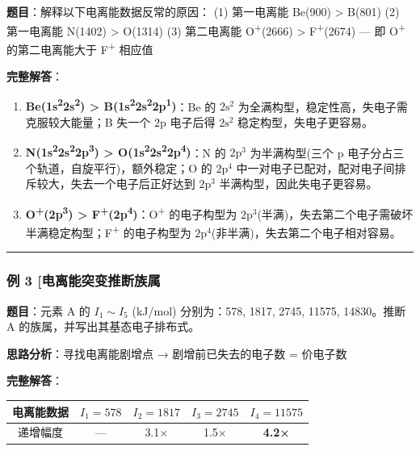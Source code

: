 \textbf{题目}：解释以下电离能数据反常的原因：
(1) 第一电离能 Be(900) \textgreater{} B(801)
(2) 第一电离能 N(1402) \textgreater{} O(1314)
(3) 第二电离能 O\textsuperscript{+}(2666) \textgreater{} F\textsuperscript{+}(2674) --- 即 O\textsuperscript{+} 的第二电离能大于 F\textsuperscript{+} 相应值

\textbf{完整解答}：

\begin{enumerate}
\def\labelenumi{(\arabic{enumi})}
\item
  \textbf{Be(1s\textsuperscript{2}2s\textsuperscript{2}) \textgreater{} B(1s\textsuperscript{2}2s\textsuperscript{2}2p\textsuperscript{1})}：Be 的 \(2\mathrm{s}^2\) 为全满构型，稳定性高，失电子需克服较大能量；B 失一个 \(2\mathrm{p}\) 电子后得 \(2\mathrm{s}^2\) 稳定构型，失电子更容易。
\item
  \textbf{N(1s\textsuperscript{2}2s\textsuperscript{2}2p\textsuperscript{3}) \textgreater{} O(1s\textsuperscript{2}2s\textsuperscript{2}2p\textsuperscript{4})}：N 的 \(2\mathrm{p}^3\) 为半满构型(三个 p 电子分占三个轨道，自旋平行)，额外稳定；O 的 \(2\mathrm{p}^4\) 中一对电子已配对，配对电子间排斥较大，失去一个电子后正好达到 \(2\mathrm{p}^3\) 半满构型，因此失电子更容易。
\item
  \textbf{O\textsuperscript{+}(2p\textsuperscript{3}) \textgreater{} F\textsuperscript{+}(2p\textsuperscript{4})}：O\textsuperscript{+} 的电子构型为 \(2\mathrm{p}^3\)(半满)，失去第二个电子需破坏半满稳定构型；F\textsuperscript{+} 的电子构型为 \(2\mathrm{p}^4\)(非半满)，失去第二个电子相对容易。
\end{enumerate}

\begin{center}\rule{0.5\linewidth}{0.5pt}\end{center}

\subsubsection{例 3 {[}电离能突变推断族属}\label{ux4f8b-3-ux7535ux79bbux80fdux7a81ux53d8ux63a8ux65adux65cfux5c5e}

\textbf{题目}：元素 A 的 \(I_1\sim I_5\) (kJ/mol) 分别为：578, 1817, 2745, 11575, 14830。推断 A 的族属，并写出其基态电子排布式。

\textbf{思路分析}：寻找电离能剧增点 → 剧增前已失去的电子数 = 价电子数

\textbf{完整解答}：

{\def\LTcaptype{none} %
\begin{longtable}[]{@{}ccccc@{}}
\toprule\noalign{}
电离能数据 & \(I_1=578\) & \(I_2=1817\) & \(I_3=2745\) & \(I_4=11575\) \\
\midrule\noalign{}
\endhead
\bottomrule\noalign{}
\endlastfoot
递增幅度 & --- & 3.1× & 1.5× & \textbf{4.2×} \\
\end{longtable}
}

